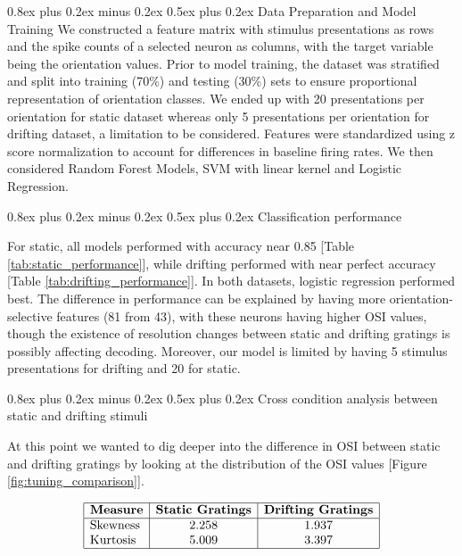 \documentclass[10pt,twocolumn]{article}
\makeatletter
\renewcommand{\subsection}{\@startsection{subsection}{2}{\z@}%
  {0.8ex plus 0.2ex minus 0.2ex}%
  {0.5ex plus 0.2ex}%
{\normalfont\normalsize\bfseries}}
\makeatother
\begin{document}
\subsection{Data Preparation and Model Training}
We constructed a feature matrix with stimulus presentations as rows and the spike counts of a selected neuron as columns, with the target variable being the orientation values. Prior to model training, the dataset was stratified and split into training (70\%) and testing (30\%) sets to ensure proportional representation of orientation classes. We ended up with 20 presentations per orientation for static dataset whereas only 5 presentations per orientation for drifting dataset, a limitation to be considered. Features were standardized using z score normalization to account for differences in baseline firing rates. We then considered Random Forest Models, SVM with linear kernel and Logistic Regression.

\subsection{Classification performance}

For static, all models performed with accuracy near 0.85 [Table \ref{tab:static_performance}], while drifting performed with near perfect accuracy [Table \ref{tab:drifting_performance}]. In both datasets, logistic regression performed best. The difference in performance can be explained by having more orientation-selective features (81 from 43), with these neurons having higher OSI values, though the existence of resolution changes between static and drifting gratings is possibly affecting decoding. Moreover, our model is limited by having 5 stimulus presentations for drifting and 20 for static.

\subsection{Cross condition analysis between static and drifting stimuli}

At this point we wanted to dig deeper into the difference in OSI between static and drifting gratings by looking at the distribution of the OSI values [Figure \ref{fig:tuning_comparison}].

\[
  \begin{array}{|l|c|c|}
    \hline
    \textbf{Measure} & \textbf{Static Gratings} & \textbf{Drifting Gratings} \\
    \hline
    \text{Skewness} & 2.258 & 1.937 \\
    \text{Kurtosis} & 5.009 & 3.397 \\
    \hline
  \end{array}
\]
\end{document}
